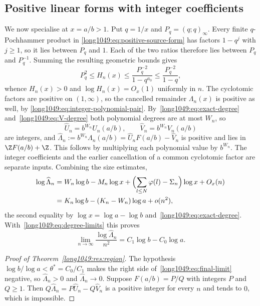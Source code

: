 \subsection{Positive linear forms with integer coefficients}\label{long1049:sec:integer-forms}

We now specialise at $x=a/b>1$. Put $q=1/x$ and $P_q=(q;q)_\infty$.
Every finite $q$-Pochhammer product in
\eqref{long1049:eq:positive-source-form} has factors $1-q^j$ with $j\ge1$,
so it lies between $P_q$ and $1$. Each of the two ratios therefore lies
between $P_q$ and $P_q^{-1}$. Summing the resulting geometric bounds gives
\[
 P_q^{2}\le H_n(x)\le\frac{P_q^{-2}}{1-q^{a_0}}\le\frac{P_q^{-2}}{1-q},
\]
whence $H_n(x)>0$ and $\log H_n(x)=O_x(1)$ uniformly in $n$.
The cyclotomic factors are positive on $(1,\infty)$, so the cancelled
remainder $\Lambda_n(x)$ is positive as well, by
\eqref{long1049:eq:integer-polynomial-pair}.
By~\eqref{long1049:eq:exact-degree} and~\eqref{long1049:eq:V-degree} both polynomial degrees are
at most $W_n$, so
\[
 \widehat U_n=b^{W_n}U_n(a/b),\qquad \widehat V_n=b^{W_n}V_n(a/b)
\]
are integers, and $\widehat\Lambda_n:=b^{W_n}\Lambda_n(a/b)
=\widehat U_nF(a/b)-\widehat V_n$ is positive and lies in $\Z F(a/b)+\Z$.  This
follows by multiplying each polynomial value by $b^{W_n}$.
The integer coefficients and the earlier cancellation of a common
cyclotomic factor are separate inputs.
Combining the size estimates,
\[
 \begin{aligned}
 \log\widehat\Lambda_n
 &=W_n\log b-M_n\log x+\Bigl(\sum_{l\le N}\varphi(l)-\Sigma_n\Bigr)\log x+O_x(n)\\
 &=K_n\log b-(K_n-W_n)\log a+o(n^{2}),
\end{aligned}
\]
the second equality by $\log x=\log a-\log b$ and~\eqref{long1049:eq:exact-degree}.
With~\eqref{long1049:eq:degree-limits} this proves
\begin{equation}\label{long1049:eq:final-limit}
 \lim_{n\to\infty}\frac{\log\widehat\Lambda_n}{n^{2}}=C_1\log b-C_0\log a .
\end{equation}

\begin{proof}[Proof of Theorem~\ref{long1049:res:region}]
The hypothesis $\log b/\log a<\theta^{*}=C_0/C_1$ makes the right side
of~\eqref{long1049:eq:final-limit} negative, so $\widehat\Lambda_n>0$ and
$\widehat\Lambda_n\to0$.  Suppose $F(a/b)=P/Q$ with integers $P$ and $Q\ge1$.
Then $Q\widehat\Lambda_n=P\widehat U_n-Q\widehat V_n$ is a positive integer for
every $n$ and tends to $0$, which is impossible.
\end{proof}

